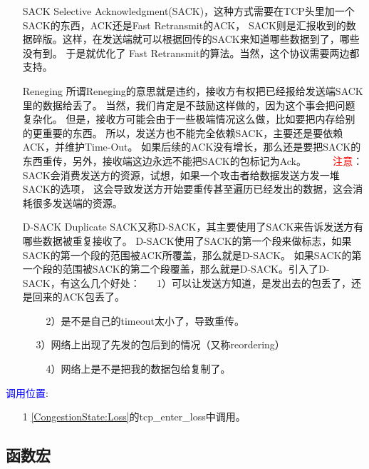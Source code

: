\begin{enumerate}
\item[SACK]         Selective Acknowledgment(SACK)，这种方式需要在TCP头里加一个SACK的东西，ACK还是Fast Retransmit的ACK，
                    SACK则是汇报收到的数据碎版。这样，在发送端就可以根据回传的SACK来知道哪些数据到了，哪些没有到。
                    于是就优化了 Fast Retransmit的算法。当然，这个协议需要两边都支持。
\item[Reneging]     所谓Reneging的意思就是违约，接收方有权把已经报给发送端SACK里的数据给丢了。
                    当然，我们肯定是不鼓励这样做的，因为这个事会把问题复杂化。
                    但是，接收方可能会由于一些极端情况这么做，比如要把内存给别的更重要的东西。
                    所以，发送方也不能完全依赖SACK，主要还是要依赖ACK，并维护Time-Out。
                    如果后续的ACK没有增长，那么还是要把SACK的东西重传，另外，接收端这边永远不能把SACK的包标记为Ack。
　　                    \textcolor{red}{注意}：SACK会消费发送方的资源，试想，如果一个攻击者给数据发送方发一堆SACK的选项，
                    这会导致发送方开始要重传甚至遍历已经发出的数据，这会消耗很多发送端的资源。

\item[D-SACK]       Duplicate SACK又称D-SACK，其主要使用了SACK来告诉发送方有哪些数据被重复接收了。
                    D-SACK使用了SACK的第一个段来做标志，如果SACK的第一个段的范围被ACK所覆盖，那么就是D-SACK。
                    如果SACK的第一个段的范围被SACK的第二个段覆盖，那么就是D-SACK。引入了D-SACK，有这么几个好处：
　                      1）可以让发送方知道，是发出去的包丢了，还是回来的ACK包丢了。

　　                     2）是不是自己的timeout太小了，导致重传。

　                      3）网络上出现了先发的包后到的情况（又称reordering）

　　                     4）网络上是不是把我的数据包给复制了。
\end{enumerate}

        \textcolor{blue}{调用位置}:

            \begin{enumerate}
                \item[1]        \ref{CongestionState:Loss}的tcp\_enter\_loss中调用。
            \end{enumerate}
    \subsection{函数宏}
